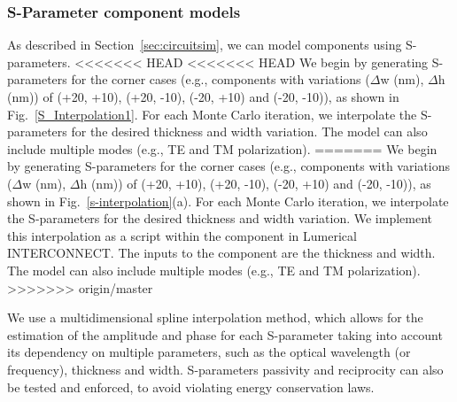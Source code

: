 \documentclass[journal]{spie}
\begin{document}
\subsubsection{S-Parameter component models}
\label{SparamModel}
As described in Section~\ref{sec:circuitsim}, we can model components using S-parameters.  
<<<<<<< HEAD
<<<<<<< HEAD
We begin by generating S-parameters for the corner cases (e.g., components with variations ($\Delta$w (nm), $\Delta$h (nm)) of (+20, +10), (+20, -10), (-20, +10) and (-20, -10)), as shown in Fig.~\ref{S_Interpolation1}.  For each Monte Carlo iteration, we interpolate the S-parameters for the desired thickness and width variation. The model can also include multiple modes (e.g., TE and TM polarization).
=======
We begin by generating S-parameters for the corner cases (e.g., components with variations ($\Delta$w (nm), $\Delta$h (nm)) of (+20, +10), (+20, -10), (-20, +10) and (-20, -10)), as shown in Fig.~\ref{s-interpolation}(a).  For each Monte Carlo iteration, we interpolate the S-parameters for the desired thickness and width variation.  We implement this interpolation as a script within the component in Lumerical INTERCONNECT.  The inputs to the component are the thickness and width.
The model can also include multiple modes (e.g., TE and TM polarization).
>>>>>>> origin/master

We use a multidimensional spline interpolation method, which allows for the estimation of the amplitude and phase for each S-parameter taking into account its dependency on multiple parameters, such as the optical wavelength (or frequency), thickness and width.  S-parameters passivity and reciprocity can also be tested and enforced, to avoid violating energy conservation laws.  
\end{document}
